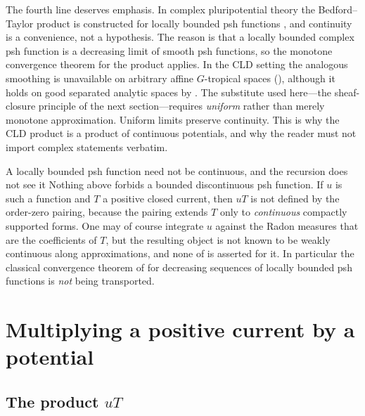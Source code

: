 The fourth line deserves emphasis.  In complex pluripotential theory the
Bedford--Taylor product is constructed for locally bounded psh functions
\cite{BT76,BT82}, and continuity is a convenience, not a hypothesis.  The
reason is that a locally bounded complex psh function is a decreasing limit
of smooth psh functions, so the monotone convergence theorem for the product
applies.  In the CLD setting the analogous smoothing is unavailable
on arbitrary affine $G$-tropical spaces
(), although it holds on good
separated analytic spaces by
.  The substitute used here---the
sheaf-closure principle of the next section---requires
\emph{uniform} rather than merely monotone approximation.  Uniform limits
preserve continuity.  This is why the CLD product is a product of continuous
potentials, and why the reader must not import complex statements verbatim.

\begin{warning}{A locally bounded psh function need not be continuous, and
the recursion does not see it}
Nothing above forbids a bounded discontinuous psh function.  If $u$ is such
a function and $T$ a positive closed current, then $uT$ is not defined by
the order-zero pairing, because the pairing extends $T$ only to
\emph{continuous} compactly supported forms.  One may of course integrate
$u$ against the Radon measures that are the coefficients of $T$, but the
resulting object is not known to be weakly continuous along approximations,
and none of  is asserted for it.
In particular the classical convergence theorem of \cite{BT82} for
decreasing sequences of locally bounded psh functions is \emph{not} being
transported.
\end{warning}

\section{Multiplying a positive current by a potential}
\label{sec:ch16-one-factor}

\subsection{The product \texorpdfstring{$uT$}{uT}}
\label{sec:ch16-uT}

